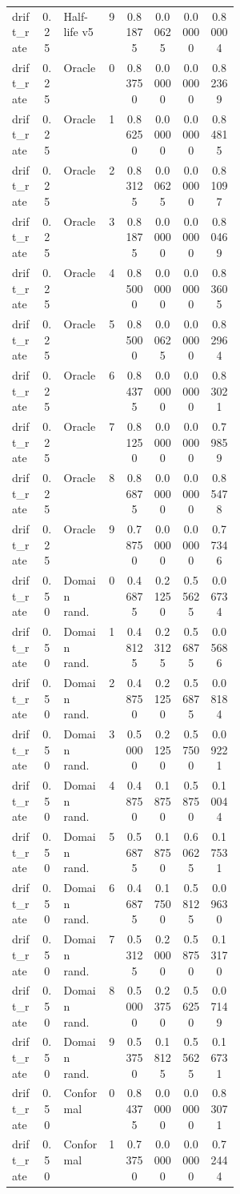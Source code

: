 \documentclass{article}
\begin{document}
\begin{center}
\begin{longtable}{p{0.13\linewidth}cp{0.20\linewidth}ccccc}
drift\_rate & 0.25 & Half-life v5 & 9 & 0.81875 & 0.00625 & 0.00000 & 0.80004\\
drift\_rate & 0.25 & Oracle & 0 & 0.83750 & 0.00000 & 0.00000 & 0.82369\\
drift\_rate & 0.25 & Oracle & 1 & 0.86250 & 0.00000 & 0.00000 & 0.84815\\
drift\_rate & 0.25 & Oracle & 2 & 0.83125 & 0.00625 & 0.00000 & 0.81097\\
drift\_rate & 0.25 & Oracle & 3 & 0.81875 & 0.00000 & 0.00000 & 0.80469\\
drift\_rate & 0.25 & Oracle & 4 & 0.85000 & 0.00000 & 0.00000 & 0.83605\\
drift\_rate & 0.25 & Oracle & 5 & 0.85000 & 0.00625 & 0.00000 & 0.82964\\
drift\_rate & 0.25 & Oracle & 6 & 0.84375 & 0.00000 & 0.00000 & 0.83021\\
drift\_rate & 0.25 & Oracle & 7 & 0.81250 & 0.00000 & 0.00000 & 0.79859\\
drift\_rate & 0.25 & Oracle & 8 & 0.86875 & 0.00000 & 0.00000 & 0.85478\\
drift\_rate & 0.25 & Oracle & 9 & 0.78750 & 0.00000 & 0.00000 & 0.77346\\
drift\_rate & 0.50 & Domain rand. & 0 & 0.46875 & 0.21250 & 0.55625 & 0.06734\\
drift\_rate & 0.50 & Domain rand. & 1 & 0.48125 & 0.23125 & 0.56875 & 0.05686\\
drift\_rate & 0.50 & Domain rand. & 2 & 0.48750 & 0.21250 & 0.56875 & 0.08184\\
drift\_rate & 0.50 & Domain rand. & 3 & 0.50000 & 0.21250 & 0.57500 & 0.09221\\
drift\_rate & 0.50 & Domain rand. & 4 & 0.48750 & 0.18750 & 0.58750 & 0.10044\\
drift\_rate & 0.50 & Domain rand. & 5 & 0.56875 & 0.18750 & 0.60625 & 0.17531\\
drift\_rate & 0.50 & Domain rand. & 6 & 0.46875 & 0.17500 & 0.58125 & 0.09630\\
drift\_rate & 0.50 & Domain rand. & 7 & 0.53125 & 0.20000 & 0.58750 & 0.13170\\
drift\_rate & 0.50 & Domain rand. & 8 & 0.50000 & 0.23750 & 0.56250 & 0.07149\\
drift\_rate & 0.50 & Domain rand. & 9 & 0.53750 & 0.18125 & 0.55625 & 0.16731\\
drift\_rate & 0.50 & Conformal & 0 & 0.84375 & 0.00000 & 0.00000 & 0.83071\\
drift\_rate & 0.50 & Conformal & 1 & 0.73750 & 0.00000 & 0.00000 & 0.72444\\

\end{longtable}
\end{center}
\end{document}
